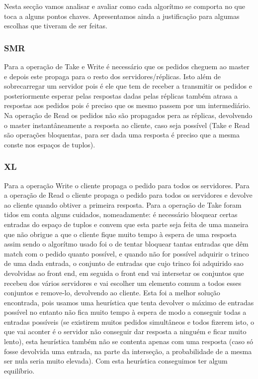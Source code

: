 \documentclass[times, 10pt,twocolumn]{article}
\begin{document}
Nesta secção vamos analisar e avaliar como cada algorítmo se comporta no que toca 
a alguns pontos chaves. Apresentamos ainda a justificação para algumas escolhas que
tiveram de ser feitas.
\subsubsection{SMR}

Para a operação de Take e Write é necessário que os pedidos cheguem ao master
e depois este propaga para o resto dos servidores/réplicas. Isto além de sobrecarregar um servidor pois 
é ele que tem de receber a transmitir os pedidos e posteriormente esperar pelas respostas 
dadas pelas réplicas também atrasa a respostas aos pedidos pois é preciso que os mesmo passem
por um intermediário.
Na operação de Read os pedidos não são propagados pera as réplicas, devolvendo o master 
instantâneamente a resposta ao cliente, caso seja possível (Take e Read são operações bloquentas, 
para ser dada uma resposta é preciso que a mesma conste nos espaços de tuplos).

\subsubsection{XL}

Para a operação Write o cliente propaga o pedido para todos os servidores. Para a operação de Read
o cliente propaga o pedido para todos os servidores e devolve ao cliente quando obtiver a primeira
resposta. Para a operação de Take foram tidos em conta alguns cuidados, nomeadamente: é necessário
bloquear certas entradas do espaço de tuplos e convem que esta parte seja feita de uma maneira que 
não obrigue a que o cliente fique muito tempo à espera de uma resposta assim sendo o algorítmo usado
foi o de tentar bloquear tantas entradas que dêm match com o pedido quanto possível, e quando não for 
possível adquirir o trinco de uma dada entrada, o conjunto de entradas que cujo trinco foi adquirido
sao devolvidas ao front end, em seguida o front end vai intersetar os conjuntos que recebeu dos vários
servidores e vai escolher um elemento comum a todos esses conjuntos e remove-lo, devolvendo ao cliente.
Esta foi a melhor solução encontrada, pois usamos uma heurística que tenta devolver o máximo de entradas
possível no entanto não fica muito tempo à espera de modo a conseguir todas a entradas possíveis (se existirem
muitos pedidos simultâneos e todos fizerem isto, o que vai aconter é o servidor não conseguir dar resposta a ninguém
e ficar muito lento), esta heurística também não se contenta apenas com uma resposta (caso só fosse devolvida uma entrada,
na parte da interseção, a probabilidade de a mesma ser nula seria muito elevada). Com esta heurística conseguimos
ter algum equilíbrio.
\end{document}
